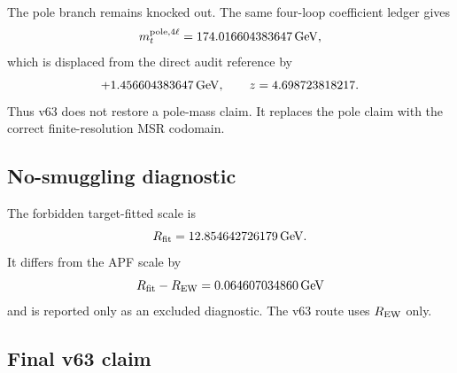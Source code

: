 The pole branch remains knocked out. The same four-loop coefficient ledger gives
\[
m_t^{{\rm pole},4\ell}=174.016604383647\,{\rm GeV},
\]
which is displaced from the direct audit reference by
\[
+1.456604383647\,{\rm GeV},
\qquad
z=4.698723818217.
\]
Thus v63 does not restore a pole-mass claim. It replaces the pole claim with the correct finite-resolution MSR codomain.

\subsection{No-smuggling diagnostic}

The forbidden target-fitted scale is
\[
R_{\rm fit}=12.854642726179\,{\rm GeV}.
\]
It differs from the APF scale by
\[
R_{\rm fit}-R_{\rm EW}=0.064607034860\,{\rm GeV}
\]
and is reported only as an excluded diagnostic. The v63 route uses $R_{\rm EW}$ only.

\subsection{Final v63 claim}

\begin{center}
\end{center}
